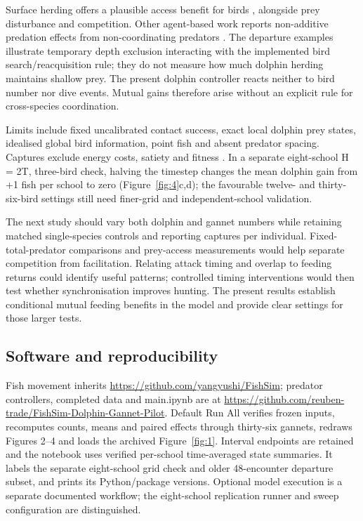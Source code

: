 \documentclass[10pt,a4paper,twocolumn]{article}
\begin{document}
Surface herding offers a plausible access benefit for birds \citep{odonoghue2009,thiebault2016,licht2026}, alongside prey disturbance and competition. Other agent-based work reports non-additive predation effects from non-coordinating predators \citep{mohapatra2025}. The departure examples illustrate temporary depth exclusion interacting with the implemented bird search/reacquisition rule; they do not measure how much dolphin herding maintains shallow prey. The present dolphin controller reacts neither to bird number nor dive events. Mutual gains therefore arise without an explicit rule for cross-species coordination.

Limits include fixed uncalibrated contact success, exact local dolphin prey states, idealised global bird information, point fish and absent predator spacing. Captures exclude energy costs, satiety and fitness \citep{thiebault2016,licht2026,stockin2022}. In a separate eight-school H = 2T, three-bird check, halving the timestep changes the mean dolphin gain from +1 fish per school to zero (Figure~\ref{fig:4}c,d); the favourable twelve- and thirty-six-bird settings still need finer-grid and independent-school validation.

The next study should vary both dolphin and gannet numbers while retaining matched single-species controls and reporting captures per individual. Fixed-total-predator comparisons and prey-access measurements would help separate competition from facilitation. Relating attack timing and overlap to feeding returns could identify useful patterns; controlled timing interventions would then test whether synchronisation improves hunting. The present results establish conditional mutual feeding benefits in the model and provide clear settings for those larger tests.

\subsection{Software and reproducibility}
Fish movement inherits \url{https://github.com/yangyushi/FishSim}; predator controllers, completed data and main.ipynb are at \url{https://github.com/reuben-trade/FishSim-Dolphin-Gannet-Pilot}. Default Run All verifies frozen inputs, recomputes counts, means and paired effects through thirty-six gannets, redraws Figures 2--4 and loads the archived Figure~\ref{fig:1}. Interval endpoints are retained and the notebook uses verified per-school time-averaged state summaries. It labels the separate eight-school grid check and older 48-encounter departure subset, and prints its Python/package versions. Optional model execution is a separate documented workflow; the eight-school replication runner and sweep configuration are distinguished.
\end{document}
